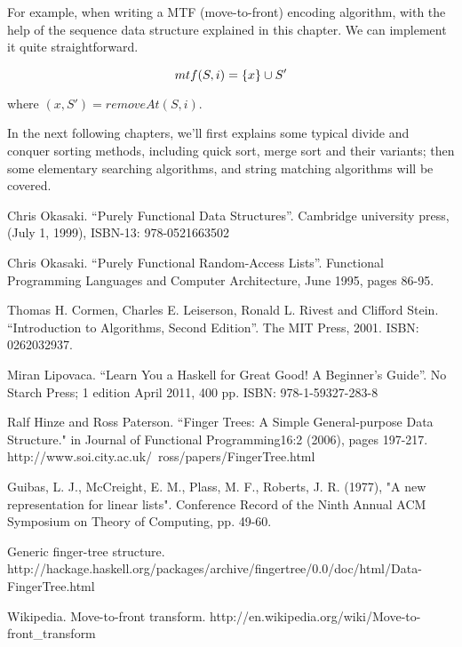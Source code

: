\documentclass[UTF8]{article}
\begin{document}
For example, when writing a MTF (move-to-front) encoding algorithm\cite{mtf-wiki}, with
the help of the sequence data structure explained in this chapter. We can
implement it quite straightforward.

\[
mtf(S, i) = \{x\} \cup S' \\
\]

where $(x, S') = removeAt(S, i)$.

In the next following chapters, we'll first explains some typical divide and conquer
sorting methods, including quick sort, merge sort and their variants; then
some elementary searching algorithms, and string matching algorithms will be
covered.


\begin{thebibliography}{99}

Chris Okasaki. ``Purely Functional Data Structures''. Cambridge university press, (July 1, 1999), ISBN-13: 978-0521663502

Chris Okasaki. ``Purely Functional Random-Access Lists''. Functional Programming Languages and Computer Architecture, June 1995, pages 86-95.

Thomas H. Cormen, Charles E. Leiserson, Ronald L. Rivest and Clifford Stein. ``Introduction to Algorithms, Second Edition''. The MIT Press, 2001. ISBN: 0262032937.

Miran Lipovaca. ``Learn You a Haskell for Great Good! A Beginner's Guide''. No Starch Press; 1 edition April 2011, 400 pp. ISBN: 978-1-59327-283-8

Ralf Hinze and Ross Paterson. ``Finger Trees: A Simple General-purpose Data Structure." in Journal of Functional Programming16:2 (2006), pages 197-217. http://www.soi.city.ac.uk/~ross/papers/FingerTree.html

Guibas, L. J., McCreight, E. M., Plass, M. F., Roberts, J. R. (1977), "A new representation for linear lists". Conference Record of the Ninth Annual ACM Symposium on Theory of Computing, pp. 49-60.

Generic finger-tree structure. http://hackage.haskell.org/packages/archive/fingertree/0.0/doc/html/Data-FingerTree.html

Wikipedia. Move-to-front transform. http://en.wikipedia.org/wiki/Move-to-front\_transform

\end{thebibliography}

\ifx\wholebook\relax \else
\end{document}
